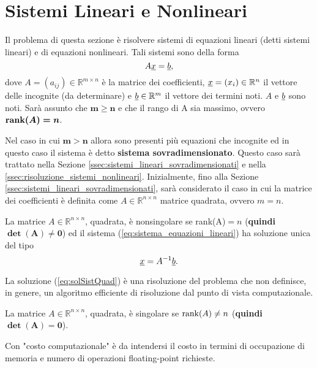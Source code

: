 \section{Sistemi Lineari e Nonlineari}
Il problema di questa sezione è risolvere sistemi di \gls{equazioni lineari} (detti \gls{sistemi lineari}) e di \gls{equazioni nonlineari}. Tali sistemi sono della forma 
\begin{equation}\label{eq:sistema_equazioni_lineari}
    A\uline{x}=\uline b,
\end{equation}
dove $A=(a_{ij})\in{\mathbb R^{m\times n}}$ è la matrice dei coefficienti, $\uline x=(x_i)\in\mathbb R^n$ il vettore delle incognite (da determinare) e $\uline b\in\mathbb R^m$ il vettore dei termini noti. $A$ e $\uline b$ sono noti. Sarà assunto che $\boldsymbol{m\geq n}$ e che il rango di A sia massimo, ovvero $\boldsymbol{\operatorname{rank}(A)=n}$.

Nel caso in cui $\boldsymbol{m>n}$ allora sono presenti più equazioni che incognite ed in questo caso il sistema è detto \textbf{sistema sovradimensionato}. Questo caso sarà trattato nella Sezione \ref{ssec:sistemi_lineari_sovradimensionati} e nella \ref{ssec:risoluzione_sistemi_nonlineari}. Inizialmente, fino alla Sezione \ref{ssec:sistemi_lineari_sovradimensionati}, sarà considerato il caso in cui la matrice dei coefficienti è definita come $A\in\mathbb R^{n\times n}$ matrice quadrata, ovvero $m=n$.

\begin{definition}\label{def:matrice_nonsingolare}
    La matrice $A\in\mathbb R^{n\times n}$, quadrata, è \gls{nonsingolare} se \gls{rank(A)}$=n$ (\textbf{quindi} $\boldsymbol{\det(A)\neq 0}$) ed il sistema (\ref{eq:sistema_equazioni_lineari}) ha soluzione unica del tipo
    \begin{equation}\label{eq:solSistQuad}
        \uline x = A^{-1} \uline b.
    \end{equation}
\end{definition}
La soluzione (\ref{eq:solSistQuad}) è una risoluzione del problema che non definisce, in genere, un algoritmo efficiente di risoluzione dal punto di vista computazionale.

\begin{definition}\label{def:matrice_singolare}
	La matrice $A\in\mathbb R^{n\times n}$, quadrata, è \gls{singolare} se $\operatorname{rank}(A)\neq n$ (\textbf{quindi} $\boldsymbol{\det(A) = 0}$).
\end{definition}

\begin{remark}
    Con "costo computazionale" è da intendersi il costo in termini di occupazione di memoria e numero di operazioni floating-point richieste.
\end{remark}

